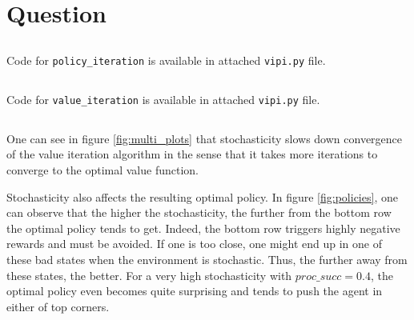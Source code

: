 \documentclass[a4paper]{article}
\begin{document}
\section{Question}

\subsection{}
Code for \texttt{policy\_iteration} is available in attached \texttt{vipi.py} file.

\subsection{}
Code for \texttt{value\_iteration} is available in attached \texttt{vipi.py} file.

\subsection{}

One can see in figure \ref{fig:multi_plots} that stochasticity slows down convergence of the value iteration algorithm in the sense that it takes more iterations to converge to the optimal value function.

Stochasticity also affects the resulting optimal policy. In figure \ref{fig:policies}, one can observe that the higher the stochasticity, the further from the bottom row the optimal policy tends to get. Indeed, the bottom row triggers highly negative rewards and must be avoided. If one is too close, one might end up in one of these bad states when the environment is stochastic. Thus, the further away from these states, the better. For a very high stochasticity with $proc\_succ = 0.4$, the optimal policy even becomes quite surprising and tends to push the agent in either of top corners.
\end{document}
